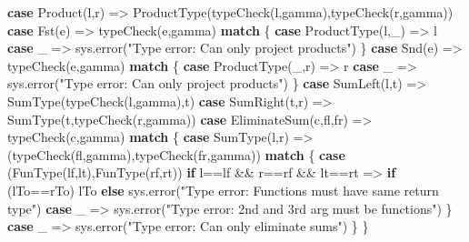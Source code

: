 \documentclass[]{article}
\newenvironment{Shaded}{}{}
\newcommand{\FunctionTok}[1]{\textcolor[rgb]{0.02,0.16,0.49}{#1}}
\newcommand{\KeywordTok}[1]{\textcolor[rgb]{0.00,0.44,0.13}{\textbf{#1}}}
\newcommand{\NormalTok}[1]{#1}
\newcommand{\StringTok}[1]{\textcolor[rgb]{0.25,0.44,0.63}{#1}}
\begin{document}
\begin{Shaded}
\begin{Highlighting}[]
  \KeywordTok{case} \FunctionTok{Product}\NormalTok{(l,r) =\textgreater{} }\FunctionTok{ProductType}\NormalTok{(}\FunctionTok{typeCheck}\NormalTok{(l,gamma),}\FunctionTok{typeCheck}\NormalTok{(r,gamma))}
  \KeywordTok{case} \FunctionTok{Fst}\NormalTok{(e) =\textgreater{} }\FunctionTok{typeCheck}\NormalTok{(e,gamma) }\KeywordTok{match}\NormalTok{ \{}
    \KeywordTok{case} \FunctionTok{ProductType}\NormalTok{(l,\_) =\textgreater{} l}
    \KeywordTok{case}\NormalTok{ \_ =\textgreater{} sys.}\FunctionTok{error}\NormalTok{(}\StringTok{"Type error: Can only project products"}\NormalTok{)}
\NormalTok{  \}}
  \KeywordTok{case} \FunctionTok{Snd}\NormalTok{(e) =\textgreater{} }\FunctionTok{typeCheck}\NormalTok{(e,gamma) }\KeywordTok{match}\NormalTok{ \{}
    \KeywordTok{case} \FunctionTok{ProductType}\NormalTok{(\_,r) =\textgreater{} r}
    \KeywordTok{case}\NormalTok{ \_ =\textgreater{} sys.}\FunctionTok{error}\NormalTok{(}\StringTok{"Type error: Can only project products"}\NormalTok{)}
\NormalTok{  \}}
  \KeywordTok{case} \FunctionTok{SumLeft}\NormalTok{(l,t) =\textgreater{} }\FunctionTok{SumType}\NormalTok{(}\FunctionTok{typeCheck}\NormalTok{(l,gamma),t)}
  \KeywordTok{case} \FunctionTok{SumRight}\NormalTok{(t,r) =\textgreater{} }\FunctionTok{SumType}\NormalTok{(t,}\FunctionTok{typeCheck}\NormalTok{(r,gamma))}
  \KeywordTok{case} \FunctionTok{EliminateSum}\NormalTok{(c,fl,fr) =\textgreater{} }\FunctionTok{typeCheck}\NormalTok{(c,gamma) }\KeywordTok{match}\NormalTok{ \{}
    \KeywordTok{case} \FunctionTok{SumType}\NormalTok{(l,r) =\textgreater{} (}\FunctionTok{typeCheck}\NormalTok{(fl,gamma),}\FunctionTok{typeCheck}\NormalTok{(fr,gamma)) }\KeywordTok{match}\NormalTok{ \{}
      \KeywordTok{case}\NormalTok{ (}\FunctionTok{FunType}\NormalTok{(lf,lt),}\FunctionTok{FunType}\NormalTok{(rf,rt)) }\KeywordTok{if}\NormalTok{ l==lf \&\& r==rf \&\& lt==rt =\textgreater{}}
        \KeywordTok{if}\NormalTok{ (lTo==rTo) lTo}
        \KeywordTok{else}\NormalTok{ sys.}\FunctionTok{error}\NormalTok{(}\StringTok{"Type error: Functions must have same return type"}\NormalTok{)}
      \KeywordTok{case}\NormalTok{ \_ =\textgreater{} sys.}\FunctionTok{error}\NormalTok{(}\StringTok{"Type error: 2nd and 3rd arg must be functions"}\NormalTok{)}
\NormalTok{    \}}
    \KeywordTok{case}\NormalTok{ \_ =\textgreater{} sys.}\FunctionTok{error}\NormalTok{(}\StringTok{"Type error: Can only eliminate sums"}\NormalTok{)}
\NormalTok{  \}}
\NormalTok{\}}
\end{Highlighting}
\end{Shaded}
\end{document}
